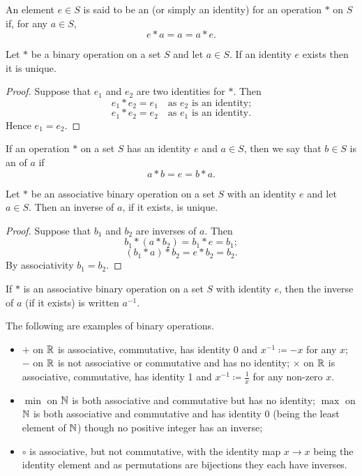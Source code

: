 An element $e \in S$ is said to be an  (or simply an identity) for an operation $\ast$ on $S$ if, for any $a \in S$,
\[ e \ast a = a = a \ast e. \]

\begin{proposition}
Let $\ast$ be a binary operation on a set $S$ and let $a \in S$. If an identity $e$ exists then it is unique.
\end{proposition}
\begin{proof}
Suppose that $e_1$ and $e_2$ are two identities for $\ast$. Then
\[ e_1 \ast e_2 = e_1 \quad \text{as }e_2\text{ is an identity;} \]
\[ e_1 \ast e_2 = e_2 \quad \text{as }e_1\text{ is an identity.} \]
Hence $e_1 = e_2$.
\end{proof}

If an operation $\ast$ on a set $S$ has an identity $e$ and $a \in S$, then we say that $b \in S$ is an  of $a$ if
\[ a \ast b = e = b \ast a. \]

\begin{proposition}
Let $\ast$ be an associative binary operation on a set $S$ with an identity $e$ and let $a \in S$. Then an inverse of $a$, if it exists, is unique.
\end{proposition}
\begin{proof}
Suppose that $b_1$ and $b_2$ are inverses of $a$. Then
\[ b_1 \ast (a \ast b_2) = b_1 \ast e = b_1; \]
\[ (b_1 \ast a) \ast b_2 = e \ast b_2 = b_2. \]
By associativity $b_1 = b_2$.
\end{proof}

\begin{notation}
If $\ast$ is an associative binary operation on a set $S$ with identity $e$, then the inverse of $a$ (if it exists) is written $a^{-1}$.
\end{notation}

\begin{example}
The following are examples of binary operations.
\begin{itemize}
\item $+$ on $\mathbb R$ is associative, commutative, has identity 0 and $x^{-1} \coloneqq -x$ for any $x$; $-$ on $\mathbb R$ is not associative or commutative and has no identity; $\times$ on $\mathbb R$ is associative, commutative, has identity 1 and $x^{-1} \coloneqq \frac{1}{x}$ for any non-zero $x$.
\item $\min$ on $\mathbb N$ is both associative and commutative but has no identity; $\max$ on $\mathbb N$ is both associative and commutative and has identity $0$ (being the least element of $\mathbb N$) though no positive integer has an inverse;
\item $\circ$ is associative, but not commutative, with the identity map $x \to x$ being the identity element and as permutations are bijections they each have inverses.
\end{itemize}
\end{example}
\pagebreak




